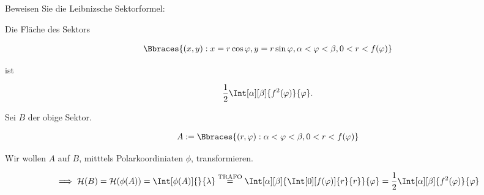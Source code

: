 
\begin{exercise}

Beweisen Sie die Leibnizsche Sektorformel:

Die Fläche des Sektors

\begin{align*}
    \Bbraces
    {
        (x, y):
        x = r \cos \varphi,
        y = r \sin \varphi,
        \alpha < \varphi < \beta,
        0 < r < f(\varphi)
    }
\end{align*}

ist

\begin{align*}
    \frac{1}{2}
    \Int[\alpha][\beta]
    {
        f^2(\varphi)
    }{\varphi}.
\end{align*}

\end{exercise}


\begin{solution}

Sei $B$ der obige Sektor.

\begin{align*}
    A := \Bbraces{(r, \varphi): \alpha < \varphi < \beta, 0 < r < f(\varphi)}
\end{align*}

Wir wollen $A$ auf $B$, mitttels Polarkoordiniaten $\phi$, transformieren.


\begin{align*}
    \implies
    \mathcal{H}(B)
    =
    \mathcal{H}(\phi(A))
    =
    \Int[\phi(A)]{}{\lambda}
    \stackrel
    {
        \text{TRAFO}
    }{=}
    \Int[\alpha][\beta]
    {
        \Int[0][f(\varphi)]
        {
            r
        }{r}
    }{\varphi}
    =
    \frac{1}{2}
    \Int[\alpha][\beta]
    {
        f^2(\varphi)
    }{
        \varphi
    }
\end{align*}

\end{solution}

